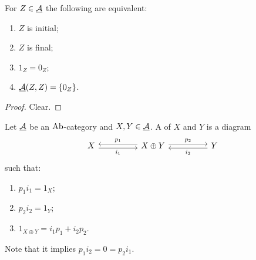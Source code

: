 \begin{proposition*}
	For \( Z \in \underline{\mathcal A} \) the following are equivalent:
	\begin{enumerate}
		\item \( Z \) is initial;
		\item \( Z \) is final;
		\item \( 1_Z = 0_Z \);
		\item \( \underline{\mathcal A}(Z, Z) = \{0_Z\} \).
	\end{enumerate}
\end{proposition*}
\begin{proof}
	Clear.
\end{proof}

\begin{definition*}
	Let \( \underline{\mathcal A} \) be an \( \mathrm{Ab} \)-category and \( X, Y \in \underline{\mathcal A} \). A  of \( X \) and \( Y \) is a diagram
	\[
		\begin{tikzcd}
			X && {X \oplus Y} && Y
			\arrow["{i_1}"', shift right, from=1-1, to=1-3]
			\arrow["{p_1}"', shift right, from=1-3, to=1-1]
			\arrow["{p_2}", shift left, from=1-3, to=1-5]
			\arrow["{i_2}", shift left, from=1-5, to=1-3]
		\end{tikzcd}
	\]
	such that:
	\begin{enumerate}
		\item \( p_1 i_1 = 1_X \);
		\item \( p_2 i_2 = 1_Y \);
		\item \( 1_{X \oplus Y} = i_1 p_1 + i_2 p_2 \).
	\end{enumerate}
	Note that it implies \( p_1 i_2 = 0 = p_2 i_1 \).
\end{definition*}

